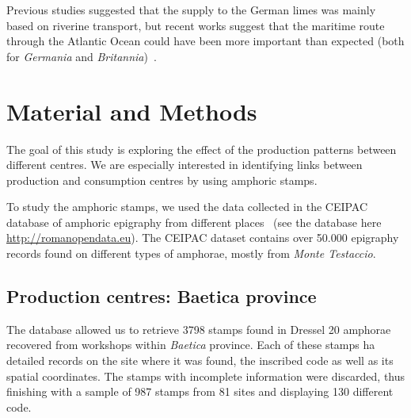 \documentclass[review]{elsarticle}
\newcommand{\memo}[2]{\textcolor{#1}{#2}}
\newcommand{\xavi}[1]{\memo{magenta}{XRC: #1\\}}
\begin{document}
Previous studies suggested that the supply to the German limes was mainly based on riverine transport, but recent works suggest that the maritime route through the Atlantic Ocean could have been more important than expected (both for \textit{Germania} and \textit{Britannia})~\citep{remesal_germn_2010,rubio-campillo_ecology_2018}.


\section{Material and Methods}

The goal of this study is exploring the effect of the production patterns between different centres. We are especially interested in identifying links between production and consumption centres by using amphoric stamps. 

To study the amphoric stamps, we used the data collected in the CEIPAC database of amphoric epigraphy from different places~\citep{remesal_centro_2015} (see the database here \url{http://romanopendata.eu}). The CEIPAC dataset contains over 50.000 epigraphy records found on different types of amphorae, mostly from \textit{Monte Testaccio}. 





\subsection{Production centres: Baetica province}


The database allowed us to retrieve 3798 stamps found in Dressel 20 amphorae recovered from workshops within \textit{Baetica} province. Each of these stamps ha detailed records on the site where it was found, the inscribed code as well as its spatial coordinates. The stamps with incomplete information were discarded, thus finishing with a sample of 987 stamps from 81 sites and displaying 130 different code.
\end{document}
